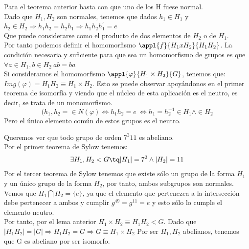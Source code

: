 \documentclass[nochap]{apuntes}
\begin{document}
 Para el teorema anterior basta con que uno de los H fuese normal.\\
 Dado que $H_1, H_2$ son normales, tenemos que dados $h_1\in H_1$  y $h_2\in H_2 \Rightarrow h_1h_2=h_2h_1 \Rightarrow h_1h_2h_1^{'}=e$\\
 Que puede considerarse como el producto de dos elementos de $H_2$  o de $H_1$.\\
 Por tanto podemos definir el homomorfismo $\appl{f}{H_1xH_2}{H_1H_2}$. La condición necesaria y suficiente para que sea un homomorfismo
 de grupos es que $\forall a \in H_1, b \in H_2 \ ab=ba$\\
 Si consideramos el homomorfismo $\appl{\varphi}{H_1\times H_2}{G}$, tenemos que:\\
 $Img(\varphi)=H_1H_2\equiv H_1 \times H_2$. Esto se puede observar apoyándonos en el primer teorema de isomorfía y viendo que el 
 núcleo de esta aplicación es el neutro, es decir, se trata de un monomorfismo.\\
 \[(h_1,h_2=\in N(\varphi) \Leftrightarrow h_1h_2=e \ \Leftrightarrow h_1=h_2^{-1}\in H_1 \wedge \in H_2\]
 Pero el único elemento común de estos grupos es el neutro.\\
 
 \begin{example}
  Queremos ver que todo grupo de orden $7^{2}11$  es abeliano.\\
  Por el primer teorema de Sylow tenemos: \\
  \[\exists H_1, H_2 <G \tq |H_1|=7^{2} \wedge |H_2|=11\]
  Por el tercer teorema de Sylow tenemos que existe sólo un grupo de la forma $H_1$  y un único grupo de la forma $H_2$, por tanto,
  ambos subgrupos son normales.\\
  Vemos que $H_1 \bigcap H_2 = \{e\}$, ya que el elemento que pertenezca a la intersección debe pertenecer a ambos y cumplir $g^49=g^11=e$  
  y esto sólo lo cumple el elemento neutro.\\
  Por tanto, por el lema anterior $H_1\times H_2 \equiv H_1H_2 < G$. Dado que $|H_1H_2|=|G| \Rightarrow H_1H_2=G \Rightarrow G \equiv H_1 \times H_2$
  Por ser $H_1, H_2$  abelianos, tenemos que G es abeliano por ser isomorfo.
  \end{example}
\end{document}
